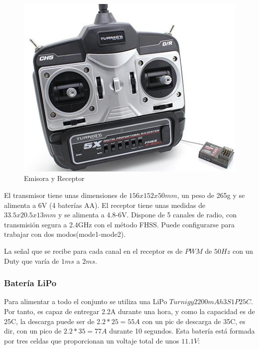 \documentclass[twoside,11pt]{report}
\begin{document}
\begin{figure}[h!]
\begin{center}
\includegraphics[scale=0.4]{images/E_R.jpg} 
\caption{Emisora y Receptor}
\end{center}
\end{figure}

El transmisor tiene unas dimensiones de $156x152x50mm$, un peso de 265g y se alimenta a 6V (4 baterías AA). El receptor tiene unas medidas de $33.5x20.5x13mm$ y se alimenta a 4.8-6V. Dispone de 5 canales de radio, con transmisión segura a 2.4GHz con el método FHSS. Puede configurarse para trabajar con dos modos(mode1-mode2).

La señal que se recibe para cada canal en el receptor es de $PWM$ de $50Hz$ con un Duty que varía de $1ms$ a $2ms$.


\subsubsection*{Batería LiPo}
Para alimentar a todo el conjunto se utiliza una LiPo $Turnigy 2200mAh 3S1P 25C$. Por tanto, es capaz de entregar 2.2A durante una hora, y como la capacidad es de 25C, la descarga puede ser de $2.2*25=55A$ con un pic de descarga de 35C, es dir, con un pico de $2.2*35=77A$ durante 10 segundos. Esta batería está formada por tres celdas que proporcionan un voltaje total de unos $11.1V$:\\
\end{document}
